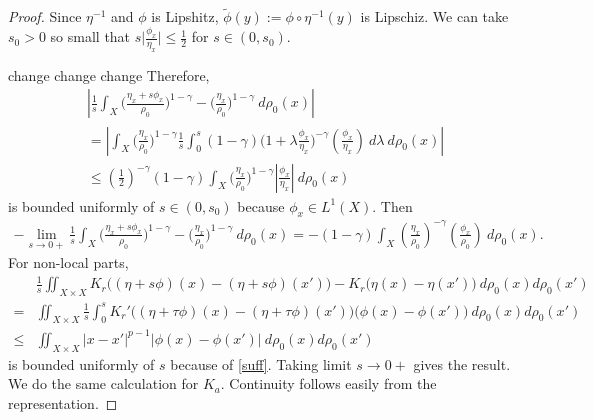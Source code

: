 \documentclass[10pt, letterpaper]{article}
\def\dr{{d\rho_0(x)}}
\theoremstyle{definition}
\theoremstyle{remark}
\begin{document}
\begin{proof}
Since $\eta^{-1}$ and $\phi$ is Lipshitz, $\tilde \phi(y) := \phi\circ \eta^{-1}(y)$ is Lipschiz. We can take $s_0>0$ so small that $s\Big|\frac{\phi_x}{\eta_x}\Big| \le \frac{1}{2}$ for $s\in(0,s_0)$.


change change change
Therefore,
\begin{align*}
 &\left|\frac{1}{s}\int_X \Big(\frac{\eta_x + s\phi_x}{\rho_0}\Big)^{1-\gamma} -\Big(\frac{\eta_x}{\rho_0}\Big)^{1-\gamma} \: \dr\right|\\
 &= \left|\int_X \Big(\frac{\eta_x}{\rho_0}\Big)^{1-\gamma} \frac{1}{s}\int_0^s(1-\gamma)\Big(1 + \lambda\frac{\phi_x}{\eta_x}\Big)^{-\gamma}\left(\frac{\phi_x}{\eta_x}\right)\:d\lambda \: \dr\right|\\
 &\le \left(\frac{1}{2}\right)^{-\gamma}(1-\gamma)\int_X \Big(\frac{\eta_x}{\rho_0}\Big)^{1-\gamma} \left|\frac{\phi_x}{\eta_x}\right| \: \dr
\end{align*}
is bounded uniformly of $s\in(0,s_0)$ because $\phi_x \in L^1(X)$. Then
 \begin{align*}
  -\lim_{s \rightarrow 0+} \frac{1}{s} \int_X \Big(\frac{\eta_x + s\phi_x}{\rho_0}\Big)^{1-\gamma} -\Big(\frac{\eta_x}{\rho_0}\Big)^{1-\gamma} \: \dr  = -(1-\gamma)\int_X \left(\frac{\eta_x}{\rho_0}\right)^{-\gamma}\left(\frac{\phi_x}{\rho_0}\right) \: \dr.
 \end{align*}
For non-local parts, 
\begin{align*}
  &\frac{1}{s}\iint_{X\times X} K_r\Big( (\eta + s\phi)(x) - (\eta + s\phi)(x')\Big)- K_r\Big(\eta(x) - \eta(x')\Big) \: d\rho_0(x)d\rho_0(x') \\
  = &\iint_{X\times X}\frac{1}{s}\int_0^s K_r'\Big( (\eta + \tau\phi)(x) - (\eta + \tau\phi)(x')\Big)\Big(\phi(x)-\phi(x')\Big)\: d\rho_0(x)d\rho_0(x')\\
  \le &\iint_{X\times X} |x-x'|^{p-1} |\phi(x)-\phi(x')| \: d\rho_0(x)d\rho_0(x') 
\end{align*}
is bounded uniformly of $s$ because of \eqref{suff}. Taking limit $s \rightarrow 0+$ gives the result. We do the same calculation for $K_a$. Continuity follows easily from the representation. %
\end{proof}
\end{document}
